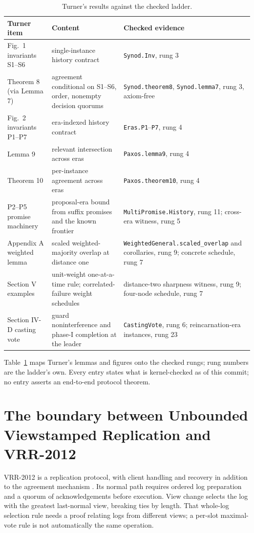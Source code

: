 \documentclass[10pt,journal,letterpaper]{IEEEtran}
\newcommand{\code}[1]{\texttt{\small #1}}
\begin{document}
\begin{table}[t]
\centering\small
\caption{Turner's results against the checked ladder.}
\label{tab:correspondence}
\begin{tabular}{>{\raggedright\arraybackslash}p{48mm}>{\raggedright\arraybackslash}p{57mm}>{\raggedright\arraybackslash}p{62mm}}
\toprule
Turner item & Content & Checked evidence\\
\midrule
Fig.~1 invariants S1--S6 & single-instance history contract &
\code{Synod.Inv}, rung 3\\
Theorem 8 (via Lemma 7) & agreement conditional on S1--S6, order, nonempty
decision quorums & \code{Synod.theorem8}, \code{Synod.lemma7}, rung 3,
axiom-free\\
Fig.~2 invariants P1--P7 & era-indexed history contract &
\code{Eras.P1}--\code{P7}, rung 4\\
Lemma 9 & relevant intersection across eras & \code{Paxos.lemma9}, rung 4\\
Theorem 10 & per-instance agreement across eras &
\code{Paxos.theorem10}, rung 4\\
P2--P5 promise machinery & proposal-era bound from suffix promises and the
known frontier & \code{MultiPromise.History}, rung 11; cross-era witness,
rung 5\\
Appendix A weighted lemma & scaled weighted-majority overlap at distance one
& \code{WeightedGeneral.scaled\_overlap} and corollaries, rung 9; concrete
schedule, rung 7\\
Section V examples & unit-weight one-at-a-time rule; correlated-failure
weight schedules & distance-two sharpness witness, rung 9; four-node
schedule, rung 7\\
Section IV-D casting vote & guard noninterference and phase-I completion at
the leader & \code{CastingVote}, rung 6; reincarnation-era instances, rung 23\\
\bottomrule
\end{tabular}
\end{table}

Table~\ref{tab:correspondence} maps Turner's lemmas and figures onto the
checked rungs; rung numbers are the ladder's own. Every entry states what is
kernel-checked as of this commit; no entry asserts an end-to-end protocol
theorem.

\section{The boundary between Unbounded Viewstamped Replication and VRR-2012}
\label{sec:boundary}
VRR-2012 is a replication protocol, with client handling and recovery in
addition to the agreement mechanism \cite{vrr}. Its normal path requires
ordered log preparation and a quorum of acknowledgements before execution.
View change selects the log with the greatest last-normal view, breaking ties
by length. That whole-log selection rule needs a proof relating logs from
different views; a per-slot maximal-vote rule is not automatically the same
operation.
\end{document}
